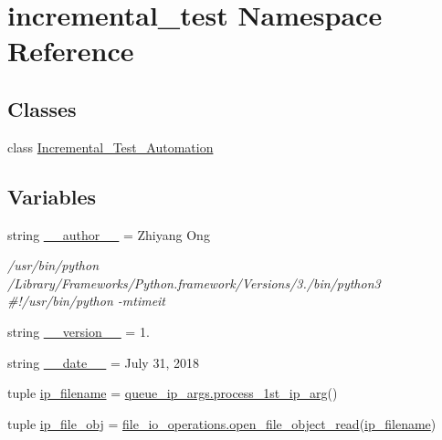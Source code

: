 \hypertarget{namespaceincremental__test}{}\section{incremental\+\_\+test Namespace Reference}
\label{namespaceincremental__test}
\subsection*{Classes}
\begin{DoxyCompactItemize}
\item 
class \hyperlink{classincremental__test_1_1Incremental__Test__Automation}{Incremental\+\_\+\+Test\+\_\+\+Automation}
\end{DoxyCompactItemize}
\subsection*{Variables}
\begin{DoxyCompactItemize}
\item 
string \hyperlink{namespaceincremental__test_a5f6427d0e520c9febabce9161afb249b}{\+\_\+\+\_\+author\+\_\+\+\_\+} = \textquotesingle{}Zhiyang Ong\textquotesingle{}
\begin{DoxyCompactList}\small\item\em /usr/bin/python /\+Library/\+Frameworks/\+Python.framework/\+Versions/3./bin/python3 \#!/usr/bin/python -\/mtimeit \end{DoxyCompactList}\item 
string \hyperlink{namespaceincremental__test_a0f94dd1f320b9558e27a5809d2041c4c}{\+\_\+\+\_\+version\+\_\+\+\_\+} = \textquotesingle{}1.\textquotesingle{}
\item 
string \hyperlink{namespaceincremental__test_afce713750b4dd215527495dfc84d047e}{\+\_\+\+\_\+date\+\_\+\+\_\+} = \textquotesingle{}July 31, 2018\textquotesingle{}
\item 
tuple \hyperlink{namespaceincremental__test_ab5a7aa877c2dae060e3fd03a472cbbf3}{ip\+\_\+filename} = \hyperlink{classutilities_1_1queue__ip__arguments_1_1queue__ip__args_ae1fc6d7af2e429d0656dbf388711db94}{queue\+\_\+ip\+\_\+args.\+process\+\_\+1st\+\_\+ip\+\_\+arg}()
\item 
tuple \hyperlink{namespaceincremental__test_aaf431f9a2a2d1172f09263453438e4f4}{ip\+\_\+file\+\_\+obj} = \hyperlink{classutilities_1_1file__io_1_1file__io__operations_a1a7ef324955033ad370338fe37e68194}{file\+\_\+io\+\_\+operations.\+open\+\_\+file\+\_\+object\+\_\+read}(\hyperlink{namespaceincremental__test_ab5a7aa877c2dae060e3fd03a472cbbf3}{ip\+\_\+filename})
\end{DoxyCompactItemize}


